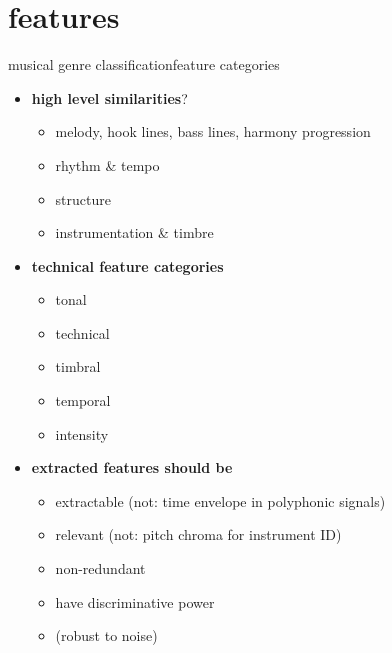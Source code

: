     \section{features}
        \begin{frame}{musical genre classification}{feature categories}
            \vspace{-3mm}
            \begin{itemize}
                \item	\textbf{high level similarities}?
                    \begin{itemize}
                        \item	melody, hook lines, bass lines, harmony progression
                        \item	rhythm \& tempo
                        \item	structure
                        \item	instrumentation \& timbre
                    \end{itemize}
                \smallskip
                \item<2->	\textbf{technical feature categories}
                    \begin{itemize}
                        \item	tonal
                        \item	technical
                        \item	timbral
                        \item	temporal
                        \item	intensity
                    \end{itemize}
                \smallskip
                \item<3->       \textbf{extracted features should be}
                    \begin{itemize}
                        \item   extractable (not: time envelope in polyphonic signals)
                        \item   relevant (not: pitch chroma for instrument ID)
                        \item   non-redundant
                        \item   have discriminative power
                        \item   (robust to noise)
                    \end{itemize}
            \end{itemize}
        \end{frame}

